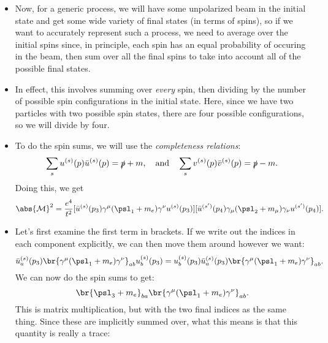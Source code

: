 \begin{itemize}
\begin{equation*}
        \end{equation*}
    \item Now, for a generic process, we will have some unpolarized beam in the initial state and get some wide variety of final states (in terms of spins), so if we want to accurately represent such a process, we need to average over the initial spins since, in principle, each spin has an equal probability of occuring in the beam, then sum over all the final spins to take into account all of the possible final states.
    \item In effect, this involves summing over \textit{every} spin, then dividing by the number of possible spin configurations in the initial state. Here, since we have two particles with two possible spin states, there are four possible configurations, so we will divide by four.
    \item To do the spin sums, we will use the \textit{completeness relations}:
        \begin{equation*}
            \sum_s u^{(s)}(p)\bar{u}^{(s)}(p) = \slashed{p}+m, \quad \mathrm{and} \quad \sum_s v^{(s)}(p)\bar{v}^{(s)}(p) = \slashed{p}-m.
        \end{equation*}
        Doing this, we get
        \begin{equation*}
            \abs{\mathcal{M}}^2 = \frac{e^4}{t^2} [\bar{u}^{(s)}(p_3)\gamma^{\mu}(\psl_{1}+m_e)\gamma^{\nu}u^{(s)}(p_3)] [\bar{u}^{(s')}(p_4)\gamma_{\mu}(\psl_{2}+m_{\mu})\gamma_{\nu}u^{(s')}(p_4)].
        \end{equation*}
    \item Let's first examine the first term in brackets. If we write out the indices in each component explicitly, we can then move them around however we want:
        \begin{equation*}
            \bar{u}_a^{(s)}(p_3)\br{\gamma^{\mu}(\psl_{1}+m_e)\gamma^{\nu}}_{ab}u^{(s)}_b(p_3) = u^{(s)}_b(p_3)\bar{u}_a^{(s)}(p_3)\br{\gamma^{\mu}(\psl_{1}+m_e)\gamma^{\nu}}_{ab}.
        \end{equation*}
        We can now do the spin sums to get: 
        \begin{equation*}
            \br{\psl_{3}+m_e}_{ba}\br{\gamma^{\mu}(\psl_{1}+m_e)\gamma^{\nu}}_{ab}.
        \end{equation*}
        This is matrix multiplication, but with the two final indices as the same thing. Since these are implicitly summed over, what this means is that this quantity is really a trace:
        \begin{equation*}

\end{equation*}
\end{itemize}
